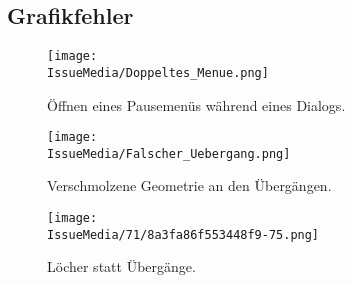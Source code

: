 %



\clearpage


	
	
\subsection*{Grafikfehler}



%
%	
%	
%


\begin{figure}[ht]

	\centering
	\label{Anhang:Grafikfehler:Dialog_Pause}
	
	\texttt{[image: \\IssueMedia/Doppeltes\_Menue.png]}
	
	\caption{Öffnen eines Pausemenüs während eines Dialogs.}

\end{figure}


\begin{figure}[ht]

	\centering
	\label{Anhang:Grafikfehler:Verschmolzene_Geometrie}
	
	\texttt{[image: \\IssueMedia/Falscher\_Uebergang.png]}
	
	\caption{Verschmolzene Geometrie an den Übergängen.}

\end{figure}


\begin{figure}[ht]

	\centering
	\label{Anhang:Grafikfehler:Verschmolzene_Geometrie}
	
	\texttt{[image: \\IssueMedia/71/8a3fa86f553448f9-75.png]}
	
	\caption{Löcher statt Übergänge.}

\end{figure}

